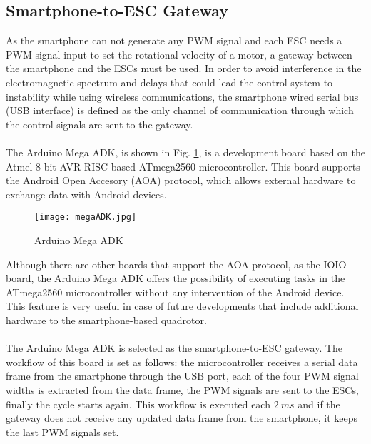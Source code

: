 \subsection{Smartphone-to-ESC Gateway}
As the smartphone can not generate any PWM signal and each ESC needs a PWM signal input to set the rotational velocity of a motor, a gateway between the smartphone and the ESCs must be used. In order to avoid interference in the electromagnetic spectrum and delays that could lead the control system to instability while using wireless communications, the smartphone wired serial bus (USB interface) is defined as the only channel of communication through which the control signals are sent to the gateway.
\\\\
The Arduino Mega ADK, is shown in Fig. \ref{fig:megaadk}, is a development board based on the Atmel 8-bit AVR RISC-based ATmega2560 microcontroller.  This board supports the Android Open Accesory (AOA) protocol, which allows external hardware to exchange data with Android devices.
\begin{figure}[H]
\begin{center}
\texttt{[image: megaADK.jpg]}    
\caption[Arduino Mega ADK]{Arduino Mega ADK\protect\footnotemark} 
\label{fig:megaadk}
\end{center}
 \end{figure}
\vspace{-0.5cm}
Although there are other boards that support the AOA protocol, as the IOIO board, the Arduino Mega ADK offers the possibility of executing tasks in the ATmega2560 microcontroller without any intervention of the Android device. This feature is very useful in case of future developments that include additional hardware to the smartphone-based quadrotor.
\\\\
The Arduino Mega ADK is selected as the smartphone-to-ESC gateway. The workflow of this board is set as follows: the microcontroller receives a serial data frame from the smartphone through the USB port, each of the four PWM signal widths is extracted from the data frame, the PWM signals are sent to the ESCs, finally the cycle starts again. This workflow is executed each $2\ ms$ and if the gateway does not receive any updated data frame from the smartphone, it keeps the last PWM signals set.

